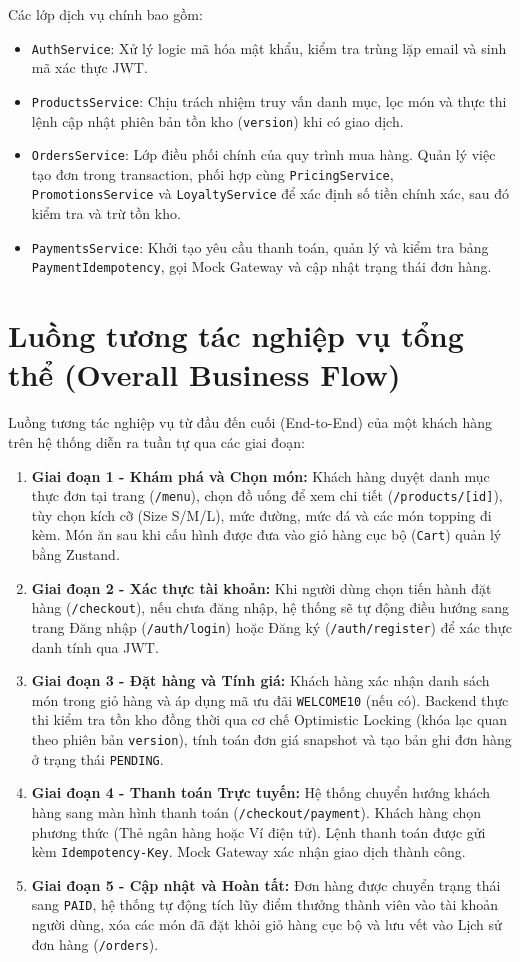 \documentclass[12pt,a4paper,oneside]{report}
\begin{document}
Các lớp dịch vụ chính bao gồm:
\begin{itemize}
    \item \texttt{AuthService}: Xử lý logic mã hóa mật khẩu, kiểm tra trùng lặp email và sinh mã xác thực JWT.
    \item \texttt{ProductsService}: Chịu trách nhiệm truy vấn danh mục, lọc món và thực thi lệnh cập nhật phiên bản tồn kho (\texttt{version}) khi có giao dịch.
    \item \texttt{OrdersService}: Lớp điều phối chính của quy trình mua hàng. Quản lý việc tạo đơn trong transaction, phối hợp cùng \texttt{PricingService}, \texttt{PromotionsService} và \texttt{LoyaltyService} để xác định số tiền chính xác, sau đó kiểm tra và trừ tồn kho.
    \item \texttt{PaymentsService}: Khởi tạo yêu cầu thanh toán, quản lý và kiểm tra bảng \texttt{PaymentIdempotency}, gọi Mock Gateway và cập nhật trạng thái đơn hàng.
\end{itemize}

\section{Luồng tương tác nghiệp vụ tổng thể (Overall Business Flow)}
Luồng tương tác nghiệp vụ từ đầu đến cuối (End-to-End) của một khách hàng trên hệ thống diễn ra tuần tự qua các giai đoạn:
\begin{enumerate}
    \item \textbf{Giai đoạn 1 - Khám phá và Chọn món:} Khách hàng duyệt danh mục thực đơn tại trang (\texttt{/menu}), chọn đồ uống để xem chi tiết (\texttt{/products/[id]}), tùy chọn kích cỡ (Size S/M/L), mức đường, mức đá và các món topping đi kèm. Món ăn sau khi cấu hình được đưa vào giỏ hàng cục bộ (\texttt{Cart}) quản lý bằng Zustand.
    \item \textbf{Giai đoạn 2 - Xác thực tài khoản:} Khi người dùng chọn tiến hành đặt hàng (\texttt{/checkout}), nếu chưa đăng nhập, hệ thống sẽ tự động điều hướng sang trang Đăng nhập (\texttt{/auth/login}) hoặc Đăng ký (\texttt{/auth/register}) để xác thực danh tính qua JWT.
    \item \textbf{Giai đoạn 3 - Đặt hàng và Tính giá:} Khách hàng xác nhận danh sách món trong giỏ hàng và áp dụng mã ưu đãi \texttt{WELCOME10} (nếu có). Backend thực thi kiểm tra tồn kho đồng thời qua cơ chế Optimistic Locking (khóa lạc quan theo phiên bản \texttt{version}), tính toán đơn giá snapshot và tạo bản ghi đơn hàng ở trạng thái \texttt{PENDING}.
    \item \textbf{Giai đoạn 4 - Thanh toán Trực tuyến:} Hệ thống chuyển hướng khách hàng sang màn hình thanh toán (\texttt{/checkout/payment}). Khách hàng chọn phương thức (Thẻ ngân hàng hoặc Ví điện tử). Lệnh thanh toán được gửi kèm \texttt{Idempotency-Key}. Mock Gateway xác nhận giao dịch thành công.
    \item \textbf{Giai đoạn 5 - Cập nhật và Hoàn tất:} Đơn hàng được chuyển trạng thái sang \texttt{PAID}, hệ thống tự động tích lũy điểm thưởng thành viên vào tài khoản người dùng, xóa các món đã đặt khỏi giỏ hàng cục bộ và lưu vết vào Lịch sử đơn hàng (\texttt{/orders}).
\end{enumerate}
\end{document}
